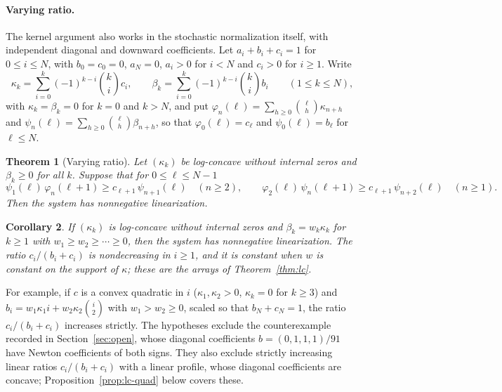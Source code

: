 \documentclass[twoside,10pt]{article}
\numberwithin{equation}{section}
\theoremstyle{slbody}
\newtheorem{theorem}{Theorem}[section]
\newtheorem{corollary}[theorem]{Corollary}
\theoremstyle{definition}
\theoremstyle{remark}
\begin{document}
\paragraph{Varying ratio.}
The kernel argument also works in the stochastic normalization itself, with independent diagonal and downward coefficients. Let $a_i+b_i+c_i=1$ for $0\leq i\leq N$, with $b_0=c_0=0$, $a_N=0$, $a_i>0$ for $i<N$ and $c_i>0$ for $i\geq1$. Write
\[
\kappa_k=\sum_{i=0}^k(-1)^{k-i}\binom kic_i,\qquad\beta_k=\sum_{i=0}^k(-1)^{k-i}\binom kib_i\qquad(1\leq k\leq N),
\]
with $\kappa_k=\beta_k=0$ for $k=0$ and $k>N$, and put $\varphi_n(\ell)=\sum_{h\geq0}\binom\ell h\kappa_{n+h}$ and $\psi_n(\ell)=\sum_{h\geq0}\binom\ell h\beta_{n+h}$, so that $\varphi_0(\ell)=c_\ell$ and $\psi_0(\ell)=b_\ell$ for $\ell\leq N$.

\begin{theorem}[Varying ratio]\label{thm:lc-vary}
Let $(\kappa_k)$ be log-concave without internal zeros and $\beta_k\geq0$ for all $k$. Suppose that for $0\leq\ell\leq N-1$
\[
\psi_1(\ell)\,\varphi_n(\ell+1)\geq c_{\ell+1}\,\psi_{n+1}(\ell)\quad(n\geq2),\qquad\varphi_2(\ell)\,\psi_n(\ell+1)\geq c_{\ell+1}\,\psi_{n+2}(\ell)\quad(n\geq1).
\]
Then the system has nonnegative linearization.
\end{theorem}

\begin{corollary}\label{cor:lc-vary}
If $(\kappa_k)$ is log-concave without internal zeros and $\beta_k=w_k\kappa_k$ for $k\geq1$ with $w_1\geq w_2\geq\cdots\geq0$, then the system has nonnegative linearization. The ratio $c_i/(b_i+c_i)$ is nondecreasing in $i\geq1$, and it is constant when $w$ is constant on the support of $\kappa$; these are the arrays of Theorem~\ref{thm:lc}.
\end{corollary}

For example, if $c$ is a convex quadratic in $i$ ($\kappa_1,\kappa_2>0$, $\kappa_k=0$ for $k\geq3$) and $b_i=w_1\kappa_1i+w_2\kappa_2\binom i2$ with $w_1>w_2\geq0$, scaled so that $b_N+c_N=1$, the ratio $c_i/(b_i+c_i)$ increases strictly. The hypotheses exclude the counterexample recorded in Section~\ref{sec:open}, whose diagonal coefficients $b=(0,1,1,1)/91$ have Newton coefficients of both signs. They also exclude strictly increasing linear ratios $c_i/(b_i+c_i)$ with a linear profile, whose diagonal coefficients are concave; Proposition~\ref{prop:lc-quad} below covers these.
\end{document}
